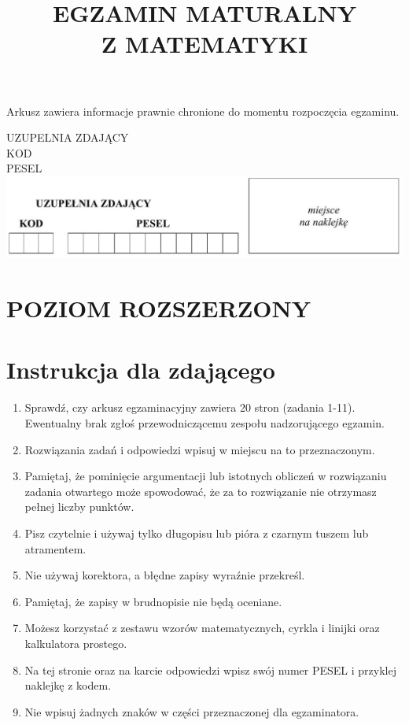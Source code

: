\documentclass[10pt]{article}
\title{EGZAMIN MATURALNY \\
 Z MATEMATYKI }
\author{}
\date{}
\begin{document}
\maketitle
Arkusz zawiera informacje prawnie chronione do momentu rozpoczęcia egzaminu.

UZUPELNIA ZDAJĄCY\\
KOD\\
PESEL\\
\includegraphics[max width=\textwidth, center]{2024_11_21_7379bf55d75dd0fc4c58g-01}

\section*{POZIOM ROZSZERZONY}
\section*{Instrukcja dla zdającego}
\begin{enumerate}
  \item Sprawdź, czy arkusz egzaminacyjny zawiera 20 stron (zadania 1-11). Ewentualny brak zgłoś przewodniczącemu zespołu nadzorującego egzamin.
  \item Rozwiązania zadań i odpowiedzi wpisuj w miejscu na to przeznaczonym.
  \item Pamiętaj, że pominięcie argumentacji lub istotnych obliczeń w rozwiązaniu zadania otwartego może spowodować, że za to rozwiązanie nie otrzymasz pełnej liczby punktów.
  \item Pisz czytelnie i używaj tylko długopisu lub pióra z czarnym tuszem lub atramentem.
  \item Nie używaj korektora, a błędne zapisy wyraźnie przekreśl.
  \item Pamiętaj, że zapisy w brudnopisie nie będą oceniane.
  \item Możesz korzystać z zestawu wzorów matematycznych, cyrkla i linijki oraz kalkulatora prostego.
  \item Na tej stronie oraz na karcie odpowiedzi wpisz swój numer PESEL i przyklej naklejkę z kodem.
  \item Nie wpisuj żadnych znaków w części przeznaczonej dla egzaminatora.
\end{enumerate}
\end{document}
